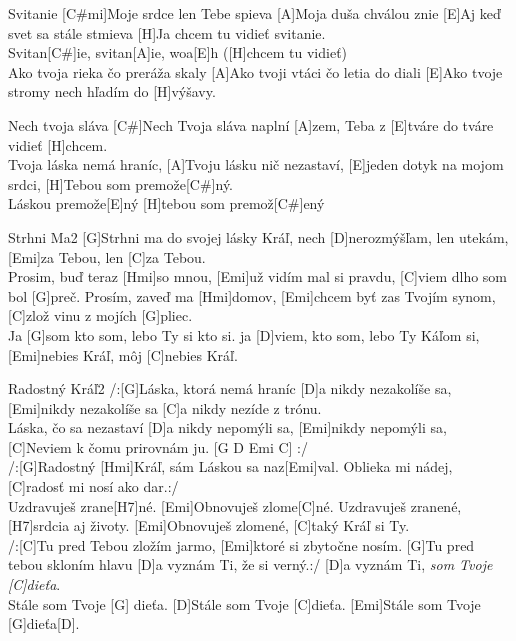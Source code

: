 \documentclass[12pt]{article}
\begin{document}
\begin{songgroup}{2}
	\begin{groupitem}{Svitanie}
		[C#mi]Moje srdce len Tebe spieva
		[A]Moja duša chválou znie
		[E]Aj keď svet sa stále stmieva
		[H]Ja chcem tu vidieť svitanie.
		\\
		Svitan[C#]ie, svitan[A]ie, woa[E]h
		([H]chcem tu vidieť)
		\\
		[C#mi]Ako tvoja rieka čo preráža skaly
		[A]Ako tvoji vtáci čo letia do diali
		[E]Ako tvoje stromy nech hľadím do [H]výšavy.
	\end{groupitem}
\columnbreak
\begin{groupitem}{Nech tvoja sláva}
	[C#]Nech Tvoja sláva naplní [A]zem,
	Teba z [E]tváre do tváre vidieť [H]chcem.
	\\
	[C#]Tvoja láska nemá hraníc, 
	[A]Tvoju lásku nič nezastaví,
	[E]jeden dotyk na mojom srdci, 
	[H]Tebou som premože[C#]ný.
	\\
	[A]Láskou premože[E]ný
	[H]tebou som premož[C#]ený
\end{groupitem}
\end{songgroup}

\begin{song}{Strhni Ma}{2}
	[G]Strhni ma do svojej lásky Kráľ,
	nech [D]nerozmýšľam, len utekám,
	[Emi]za Tebou, len [C]za Tebou.
	\\
	[G]Prosim, buď teraz [Hmi]so mnou,
	[Emi]už vidím mal si pravdu,
	[C]viem dlho som bol [G]preč.
	\columnbreak
	Prosím, zaveď ma [Hmi]domov,
	[Emi]chcem byť zas Tvojím synom,
	[C]zlož vinu z mojích [G]pliec.
	\\
	Ja [G]som kto som, lebo Ty si kto si.
	ja [D]viem, kto som, lebo Ty Káľom si,
	[Emi]nebies Kráľ, môj [C]nebies Kráľ.
\end{song}

\begin{song}{Radostný Kráľ}{2}
/:[G]Láska, ktorá nemá hraníc
[D]a nikdy nezakolíše sa,
[Emi]nikdy nezakolíše sa
[C]a nikdy nezíde z trónu.
\\
[G]Láska, čo sa nezastaví
[D]a nikdy nepomýli sa,
[Emi]nikdy nepomýli sa,
[C]Neviem k čomu prirovnám ju. 
[G D Emi C] :/ 
\\
/:[G]Radostný [Hmi]Kráľ,
sám Láskou sa naz[Emi]val.
Oblieka mi nádej,
[C]radosť mi nosí ako dar.:/
\\
[G]Uzdravuješ zrane[H7]né.
[Emi]Obnovuješ zlome[C]né. 
\columnbreak
[G]Uzdravuješ zranené, 
[H7]srdcia aj životy.
[Emi]Obnovuješ zlomené, 
[C]taký Kráľ si Ty.
\\
/:[C]Tu pred Tebou zložím jarmo,
[Emi]ktoré si zbytočne nosím.
[G]Tu pred tebou skloním hlavu
[D]a vyznám Ti, že si verný.:/
[D]a vyznám Ti, \textit{som Tvoje [C]dieťa}.
\\
[Emi]Stále som Tvoje [G] dieťa.
[D]Stále som Tvoje [C]dieťa.
[Emi]Stále som Tvoje [G]dieťa[D].
\end{song}
\end{document}
